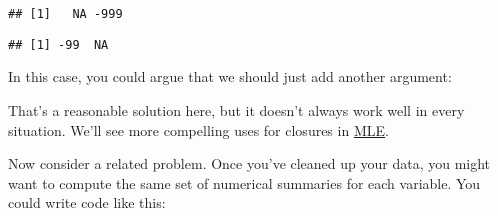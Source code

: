 \begin{verbatim}
## [1]   NA -999
\end{verbatim}

\begin{Shaded}
\begin{Highlighting}[]
\NormalTok{(}\NormalTok{(}\OperatorTok{-}\NormalTok{, }\NormalTok{))}
\end{Highlighting}
\end{Shaded}

\begin{verbatim}
## [1] -99  NA
\end{verbatim}

\begin{shortbox}

In this case, you could argue that we should just add another argument:

\begin{Shaded}
\begin{Highlighting}[]
\StringTok{ }
\NormalTok{  x[x }\OperatorTok{==}\StringTok{ }\NormalTok{na.value] <-}\StringTok{ }
\NormalTok{\}}
\end{Highlighting}
\end{Shaded}

That's a reasonable solution here, but it doesn't always work well in
every situation. We'll see more compelling uses for closures in
\protect\hyperlink{functionals-math}{MLE}.

\end{shortbox}

Now consider a related problem. Once you've cleaned up your data, you
might want to compute the same set of numerical summaries for each
variable. You could write code like this:

\begin{Shaded}
\begin{Highlighting}[]
\OperatorTok{$}
\OperatorTok{$}
\OperatorTok{$}
\OperatorTok{$}
\OperatorTok{$}

\OperatorTok{$}
\OperatorTok{$}
\OperatorTok{$}
\OperatorTok{$}
\OperatorTok{$}
\end{Highlighting}
\end{Shaded}

